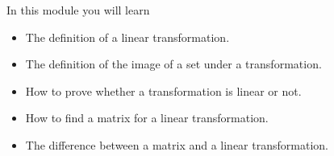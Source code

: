 \documentclass{workbook}
\begin{document}
\begin{module}

	In this module you will learn
	\begin{itemize}
		\item The definition of a linear transformation.
		\item The definition of the image of a set under a transformation.
		\item How to prove whether a transformation is linear or not.
		\item How to find a matrix for a linear transformation.
		\item The difference between a matrix and a linear transformation.
	\end{itemize}

	
	
\end{module}
\end{document}
